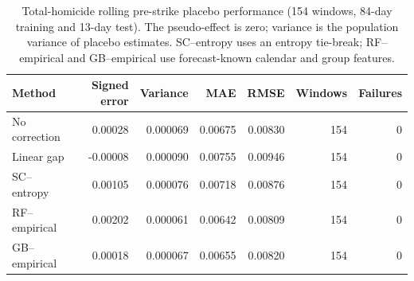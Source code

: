 \begin{table}[htbp]
\centering\small
\caption{Total-homicide rolling pre-strike placebo performance (154 windows, 84-day training and 13-day test). The pseudo-effect is zero; variance is the population variance of placebo estimates. SC--entropy uses an entropy tie-break; RF--empirical and GB--empirical use forecast-known calendar and group features.}
\label{tab:placeborebuild}
\begin{tabular}{lrrrrrr}
\toprule
Method & Signed error & Variance & MAE & RMSE & Windows & Failures\\
\midrule
No correction & 0.00028 & 0.000069 & 0.00675 & 0.00830 & 154 & 0\\
Linear gap & -0.00008 & 0.000090 & 0.00755 & 0.00946 & 154 & 0\\
SC--entropy & 0.00105 & 0.000076 & 0.00718 & 0.00876 & 154 & 0\\
RF--empirical & 0.00202 & 0.000061 & 0.00642 & 0.00809 & 154 & 0\\
GB--empirical & 0.00018 & 0.000067 & 0.00655 & 0.00820 & 154 & 0\\
\bottomrule
\end{tabular}
\end{table}
